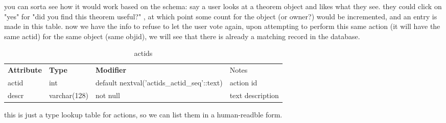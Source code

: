 you can sorta see how it would work based on the schema: say a user looks at a theorem object and likes what they see.  they could click on "yes" for "did you find this theorem useful?" , at which point some count for the object (or owner?) would be incremented, and an entry is made in this table.  now we have the info to refuse to let the user vote again, upon attempting to perform this same action (it will have the same actid) for the same object (same objid), we will see that there is already a matching record in the database.

\begin{table}
\begin{center}
\begin{tabular}{llll}
{\bf Attribute } & {\bf Type} & {\bf Modifier} & Notes \\
actid        & int          & default nextval('actids\_actid\_seq'::text) & action id \\
descr        & varchar(128) & not null &  text description
\end{tabular}
\end{center}
\caption{actids}
\end{table}

this is just a type lookup table for actions, so we can list them in a human-readble form.


